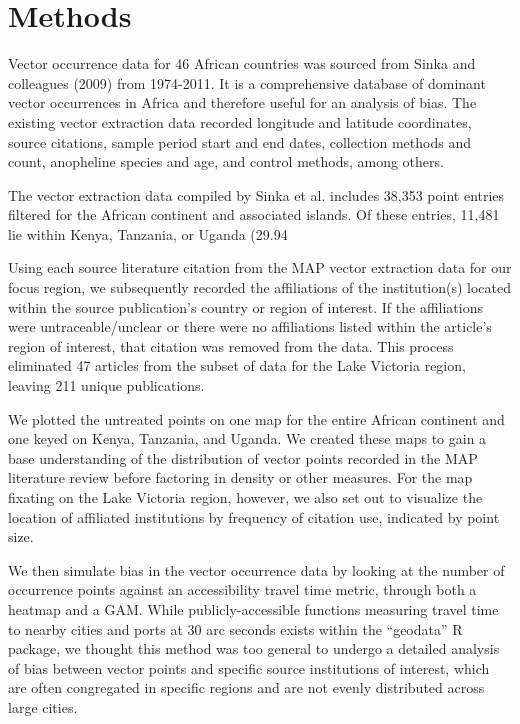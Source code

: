 \documentclass[sn-nature]{sn-jnl}%
\begin{document}
\section*{Methods}\label{methods}
Vector occurrence data for 46 African countries was sourced from Sinka and colleagues (2009) from 1974-2011. It is a comprehensive database of dominant vector occurrences in Africa and therefore useful for an analysis of bias. The existing vector extraction data recorded longitude and latitude coordinates, source citations, sample period start and end dates, collection methods and count, anopheline species and age, and control methods, among others. 

The vector extraction data compiled by Sinka et al. includes 38,353 point entries filtered for the African continent and associated islands. Of these entries, 11,481 lie within Kenya, Tanzania, or Uganda (29.94%

Using each source literature citation from the MAP vector extraction data for our focus region, we subsequently recorded the affiliations of the institution(s) located within the source publication’s country or region of interest. If the affiliations were untraceable/unclear or there were no affiliations listed within the article’s region of interest, that citation was removed from the data. This process eliminated 47 articles from the subset of data for the Lake Victoria region, leaving 211 unique publications. 

We plotted the untreated points on one map for the entire African continent and one keyed on Kenya, Tanzania, and Uganda. We created these maps to gain a base understanding of the distribution of vector points recorded in the MAP literature review before factoring in density or other measures. For the map fixating on the Lake Victoria region, however, we also set out to visualize the location of affiliated institutions by frequency of citation use, indicated by point size.

We then simulate bias in the vector occurrence data by looking at the number of occurrence points against an accessibility travel time metric, through both a heatmap and a GAM. While publicly-accessible functions measuring travel time to nearby cities and ports at 30 arc seconds exists within the “geodata” R package, we thought this method was too general to undergo a detailed analysis of bias between vector points and specific source institutions of interest, which are often congregated in specific regions and are not evenly distributed across large cities. 
\end{document}

